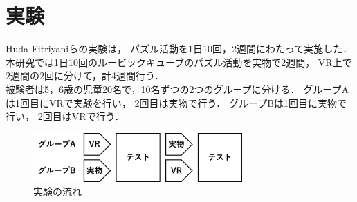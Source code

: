 \section{実験}
  Huda Fitriyaniらの実験\cite{puzzle}は，
  パズル活動を1日10回，2週間にわたって実施した．
  本研究では1日10回のルービックキューブのパズル活動を実物で2週間，
  VR上で2週間の2回に分けて，計4週間行う．
  \\\indent
  被験者は5，6歳の児童20名で，10名ずつの2つのグループに分ける．
  グループAは1回目にVRで実験を行い，
  2回目は実物で行う．
  グループBは1回目に実物で行い，
  2回目はVRで行う．
  \begin{figure}[h]
    \begin{center}
      \includegraphics[width=80mm]{./images/experiment.png}
      \caption{実験の流れ}
    \end{center}
  \end{figure}
